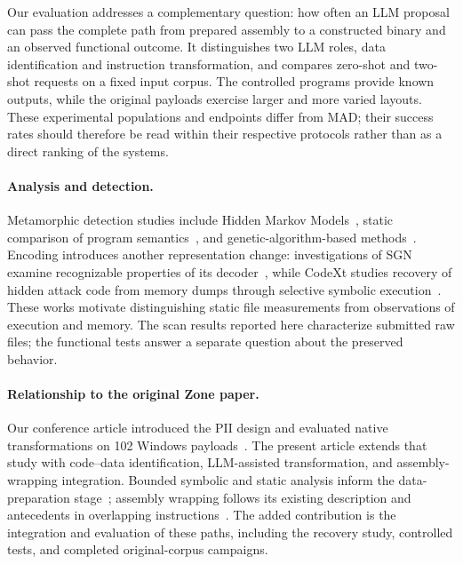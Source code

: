Our evaluation addresses a complementary question: how often an LLM
proposal can pass the complete path from prepared assembly to a
constructed binary and an observed functional outcome. It distinguishes
two LLM roles, data identification and instruction transformation, and
compares zero-shot and two-shot requests on a fixed input corpus.
The controlled programs provide known outputs, while the original
payloads exercise larger and more varied layouts. These experimental
populations and endpoints differ from MAD; their success rates should
therefore be read within their respective protocols rather than as a
direct ranking of the systems.

\paragraph{Analysis and detection.}
Metamorphic detection studies include Hidden Markov
Models~\cite{wong2006hunting,desai2010highly}, static comparison of
program semantics~\cite{identifyingmeth}, and genetic-algorithm-based
methods~\cite{methgenetic}. Encoding introduces another representation
change: investigations of SGN examine recognizable properties of its
decoder~\cite{sgnstrong}, while CodeXt studies recovery of hidden attack
code from memory dumps through selective symbolic
execution~\cite{codeExtraction}. These works motivate distinguishing
static file measurements from observations of execution and memory.
The scan results reported here characterize submitted raw files; the
functional tests answer a separate question about the preserved behavior.

\paragraph{Relationship to the original Zone paper.}
Our conference article introduced the PII design and evaluated native
transformations on 102 Windows payloads~\cite{zone_secrypt_2026}. The
present article extends that study with code--data identification,
LLM-assisted transformation, and assembly-wrapping integration.
Bounded symbolic and static analysis inform the data-preparation
stage~\cite{angr_cfg_docs}; assembly wrapping follows its existing
description and antecedents in overlapping
instructions~\cite{assembly_wrapping}. The added contribution is the
integration and evaluation of these paths, including the recovery study,
controlled tests, and completed original-corpus campaigns.
